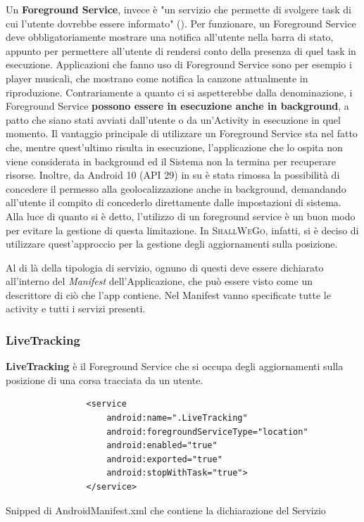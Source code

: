                 Un \textbf{Foreground Service}, invece è "un servizio che permette di svolgere task di cui l'utente dovrebbe essere informato" (\cite{AndroidDocForeground}). Per funzionare, un Foreground Service deve obbligatoriamente mostrare una notifica all'utente nella barra di stato, appunto per permettere all'utente di rendersi conto della presenza di quel task in esecuzione. Applicazioni che fanno uso di Foreground Service sono per esempio i player musicali, che mostrano come notifica la canzone attualmente in riproduzione. Contrariamente a quanto ci si aspetterebbe dalla denominazione, i Foreground Service \textbf{possono essere in esecuzione anche in background}, a patto che siano stati avviati dall'utente o da un'Activity in esecuzione in quel momento. Il vantaggio principale di utilizzare un Foreground Service sta nel fatto che, mentre quest'ultimo risulta in esecuzione, l'applicazione che lo ospita non viene considerata in background ed il Sistema non la termina per recuperare risorse. Inoltre, da Android 10 (API 29) in su è stata rimossa la possibilità di concedere il permesso alla geolocalizzazione anche in background, demandando all'utente il compito di concederlo direttamente dalle impostazioni di sistema. Alla luce di quanto si è detto, l'utilizzo di un foreground service è un buon modo per evitare la gestione di questa limitazione. In \textsc{ShallWeGo}, infatti, si è deciso di utilizzare quest'approccio per la gestione degli aggiornamenti sulla posizione.

                Al di là della tipologia di servizio, ognuno di questi deve essere dichiarato all'interno del \textit{Manifest} dell'Applicazione, che può essere visto come un descrittore di ciò che l'app contiene. Nel Manifest vanno specificate tutte le activity e tutti i servizi presenti.

                \subsubsection{LiveTracking}
                    \textbf{LiveTracking} è il Foreground Service che si occupa degli aggiornamenti sulla posizione di una corsa tracciata da un utente.

                    \begin{center}
                        \begin{code}
                            \begin{verbatim}
                <service
                    android:name=".LiveTracking"
                    android:foregroundServiceType="location"
                    android:enabled="true"
                    android:exported="true"
                    android:stopWithTask="true">
                </service>
                            \end{verbatim}
                            \caption{Snipped di AndroidManifest.xml che contiene la dichiarazione del Servizio}
                        \end{code}
                    \end{center}
    
